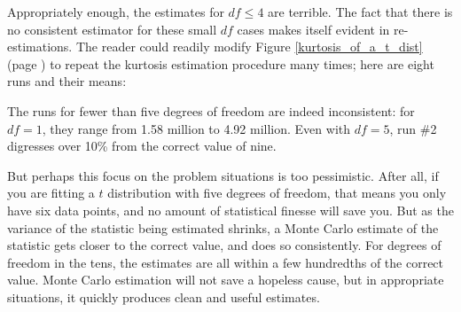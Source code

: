 Appropriately enough, the estimates for $df\leq 4$ are terrible.  
The fact that there is no consistent estimator for these small 
$df$ cases makes itself evident in re-estimations. The reader could readily
modify Figure \ref{kurtosis_of_a_t_dist} (page \pageref{kurtosis_of_a_t_dist}) to repeat the kurtosis estimation
procedure many times; here are eight runs and their means:

\vspace{\baselineskip}
\iftwocol\hspace{-8.0cm} 
\else\hspace{-1.4cm} \fi
{}
\vspace{\baselineskip}

The runs for fewer than five degrees of freedom are indeed inconsistent:
for $df = 1$, they range from 1.58 million to 4.92 million. Even with
$df = 5$, run \#2 digresses over 10\% from the correct value of nine.

But perhaps this focus on the problem situations is too pessimistic.
After all, if you are fitting a $t$ distribution with five degrees
of freedom, that means you only have six data points, and no amount of
statistical finesse will save you. But as the variance of the statistic being
estimated shrinks, a Monte Carlo estimate of the statistic gets closer to
the correct value, and does so consistently. For degrees of freedom in the
tens, the estimates are all within a few hundredths of the correct value.
Monte Carlo estimation will not save a hopeless cause, but in
appropriate situations, it quickly produces clean and useful estimates.

